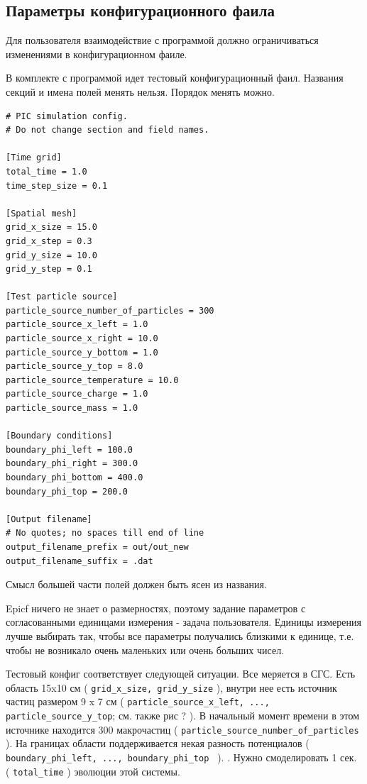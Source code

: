 \subsection{ Параметры конфигурационного фаила }
\label{sec:config_file}

Для пользователя взаимодействие с программой должно ограничиваться изменениями в конфигурационном фаиле.

В комплекте с программой идет тестовый конфигурационный фаил.
Названия секций и имена полей менять нельзя. 
Порядок менять можно.
\begin{verbatim}
# PIC simulation config.
# Do not change section and field names.

[Time grid]
total_time = 1.0
time_step_size = 0.1

[Spatial mesh]
grid_x_size = 15.0
grid_x_step = 0.3
grid_y_size = 10.0
grid_y_step = 0.1

[Test particle source]
particle_source_number_of_particles = 300
particle_source_x_left = 1.0
particle_source_x_right = 10.0
particle_source_y_bottom = 1.0
particle_source_y_top = 8.0
particle_source_temperature = 10.0
particle_source_charge = 1.0
particle_source_mass = 1.0

[Boundary conditions]
boundary_phi_left = 100.0
boundary_phi_right = 300.0
boundary_phi_bottom = 400.0
boundary_phi_top = 200.0

[Output filename]
# No quotes; no spaces till end of line
output_filename_prefix = out/out_new
output_filename_suffix = .dat
\end{verbatim}
Смысл большей части полей должен быть ясен из названия.

Epicf ничего не знает о размерностях, поэтому задание параметров с согласованными единицами измерения - задача пользователя.
Единицы измерения лучше выбирать так, чтобы все параметры получались близкими к единице, т.е. чтобы не возникало
очень маленьких или очень больших чисел.

Тестовый конфиг соответствует следующей ситуации. Все меряется в СГС.
Есть область 15x10 см ( \texttt{grid\_x\_size, grid\_y\_size} ), внутри нее есть источник частиц размером 9 x 7 см 
( \texttt{particle\_source\_x\_left, ..., particle\_source\_y\_top}; см. также рис ? ).
В начальный момент времени в этом источнике находится 300 макрочастиц ( \texttt{particle\_source\_number\_of\_particles} ).
На границах области поддерживается некая разность потенциалов ( \texttt{ boundary\_phi\_left, ..., boundary\_phi\_top } ).
. 
Нужно смоделировать 1 сек. ( \texttt{total\_time} ) эволюции этой системы.


